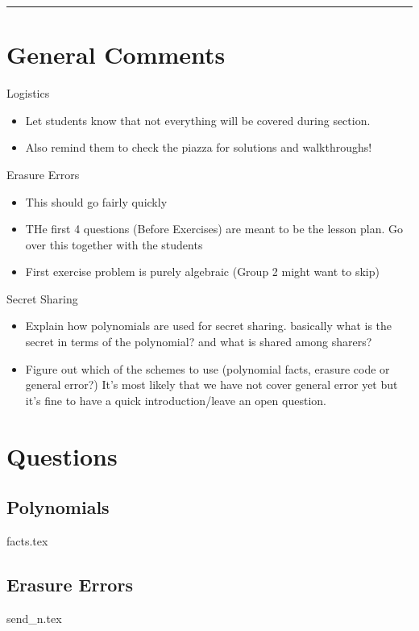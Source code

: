 \documentclass{exam}
\title{}
\date{Polynomials, Secret Sharing, Erasure Errors, General Errors, Self Reference}
\begin{document}
\maketitle
\rule{\textwidth}{0.15em}
\fontsize{12}{15}\selectfont
\thispagestyle{empty}


\section{General Comments}
\begin{questions}
\item Logistics
\begin{itemize}
\item Let students know that not everything will be covered during section. 
\item Also remind them to check the piazza for solutions and walkthroughs!
\end{itemize}
\item Erasure Errors
\begin{itemize}
\item This should go fairly quickly
\item THe first 4 questions (Before Exercises) are meant to be the lesson plan. Go over this together with the students
\item First exercise problem is purely algebraic (Group 2 might want to skip)
\end{itemize}

\item Secret Sharing
\begin{itemize}
\item Explain how polynomials are used for secret sharing. basically what is the secret in terms of the polynomial? and what is shared among sharers?
\item Figure out which of the schemes to use (polynomial facts, erasure code or general error?) It's most likely that we have not cover general error yet but it's fine to have a quick introduction/leave an open question.
\end{itemize}


\end{questions}

\section{Questions}
\subsection{Polynomials}
\begin{enumerate}
{facts.tex}
\end{enumerate}

\subsection{Erasure Errors}
\begin{enumerate}
{send_n.tex}
\end{enumerate}
\end{document}
